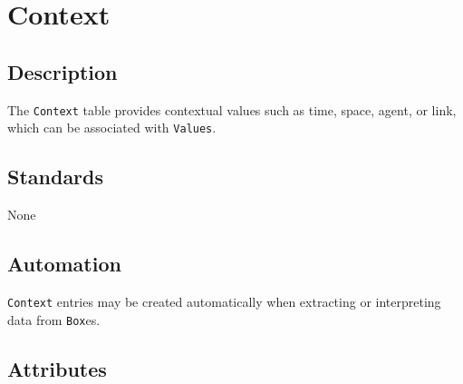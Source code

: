 \documentclass[
]{article}
\begin{document}
\section{Context}\label{context}

\subsection{Description}\label{description-8}

The \texttt{Context} table provides contextual values such as time,
space, agent, or link, which can be associated with \texttt{Values}.

\subsection{Standards}\label{standards-10}

None

\subsection{Automation}\label{automation-10}

\texttt{Context} entries may be created automatically when extracting or
interpreting data from \texttt{Box}es.

\subsection{Attributes}\label{attributes-10}
\end{document}
